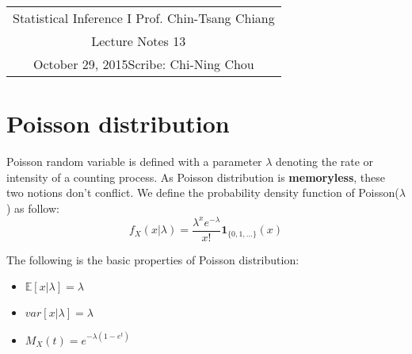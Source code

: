 \documentclass[11pt]{article}
\newcommand{\scribe}{Chi-Ning Chou}
\newcommand{\lecnum}{13}
\newcommand{\lecdate}{October 29, 2015}
\begin{document}
	
	\begin{center}
		\renewcommand{\arraystretch}{2}
		\begin{bfseries}
			\begin{tabular}{|c|}
				\hline
				Statistical Inference I \hfill Prof. Chin-Tsang Chiang\\
				\hspace{15em} {\large Lecture Notes \lecnum} \hspace{15em}\ \\
				\lecdate \hfill Scribe: \scribe\\
				\hline
			\end{tabular}
			\renewcommand{\arraystretch}{1}
		\end{bfseries}
	\end{center}	
\section{Poisson distribution}
Poisson random variable is defined with a parameter $\lambda$ denoting the rate or intensity of a counting process. As Poisson distribution is {\bf memoryless}, these two notions don't conflict. We define the probability density function of Poisson($\lambda$) as follow:
$$f_X(x|\lambda) = \frac{\lambda^x e^{-\lambda}}{x!}\mathbf{1}_{\{0,1,...\}}(x)$$

\noindent The following is the basic properties of Poisson distribution:
\begin{itemize}
	\item $\mathbb{E}[x|\lambda] = \lambda$
	\item $var[x|\lambda]=\lambda$
	\item $M_X(t) = e^{-\lambda(1-e^t)}$
\end{itemize}
\end{document}
